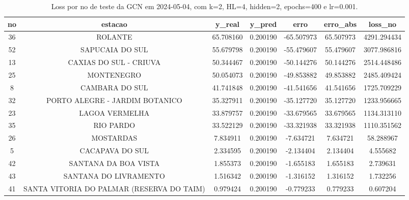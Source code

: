 \begin{table}[h]
\centering
\caption{Loss por no de teste da GCN em 2024-05-04, com k=2, HL=4, hidden=2, epochs=400 e lr=0.001.}
\label{tab:gcn_loss_k2_hl4_h2_e400_d20240504}
\begin{tabular}{ccccccc}
\toprule
no & estacao & y\_real & y\_pred & erro & erro\_abs & loss\_no \\
\midrule
36 & ROLANTE & 65.708160 & 0.200190 & -65.507973 & 65.507973 & 4291.294434 \\
52 & SAPUCAIA DO SUL & 55.679798 & 0.200190 & -55.479607 & 55.479607 & 3077.986816 \\
13 & CAXIAS DO SUL - CRIUVA & 50.344467 & 0.200190 & -50.144276 & 50.144276 & 2514.448486 \\
25 & MONTENEGRO & 50.054073 & 0.200190 & -49.853882 & 49.853882 & 2485.409424 \\
8 & CAMBARA DO SUL & 41.741848 & 0.200190 & -41.541656 & 41.541656 & 1725.709229 \\
32 & PORTO ALEGRE - JARDIM BOTANICO & 35.327911 & 0.200190 & -35.127720 & 35.127720 & 1233.956665 \\
23 & LAGOA VERMELHA & 33.879757 & 0.200190 & -33.679565 & 33.679565 & 1134.313110 \\
35 & RIO PARDO & 33.522129 & 0.200190 & -33.321938 & 33.321938 & 1110.351562 \\
26 & MOSTARDAS & 7.834911 & 0.200190 & -7.634721 & 7.634721 & 58.288967 \\
5 & CACAPAVA DO SUL & 2.334595 & 0.200190 & -2.134404 & 2.134404 & 4.555682 \\
42 & SANTANA DA BOA VISTA & 1.855373 & 0.200190 & -1.655183 & 1.655183 & 2.739631 \\
43 & SANTANA DO LIVRAMENTO & 1.516342 & 0.200190 & -1.316152 & 1.316152 & 1.732256 \\
41 & SANTA VITORIA DO PALMAR (RESERVA DO TAIM) & 0.979424 & 0.200190 & -0.779233 & 0.779233 & 0.607204 \\
\bottomrule
\end{tabular}
\end{table}
